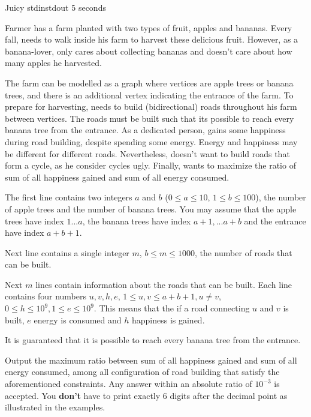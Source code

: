 \begin{problem}{Juicy}
{stdin}{stdout}
{5 seconds}{}{}

Farmer \pittoresque has a farm planted with two types of fruit, apples and bananas. Every fall, \pittoresque needs to walk inside his farm to harvest these delicious fruit. However, as a banana-lover, \pittoresque only cares about collecting bananas and doesn't care about how many apples he harvested. 

The farm can be modelled as a graph where vertices are apple trees or banana trees, and there is an additional vertex indicating the entrance of the farm. To prepare for harvesting, \pittoresque needs to build (bidirectional) roads throughout his farm between vertices. The roads must be built such that its possible to reach every banana tree from the entrance. As a dedicated person, \pittoresque gains some happiness during road building, despite spending some energy. Energy and happiness may be different for different roads. Nevertheless, \pittoresque doesn't want to build roads that form a cycle, as he consider cycles ugly. Finally, \pittoresque wants to maximize the ratio of sum of all happiness gained and sum of all energy consumed.

\InputFile

The first line contains two integers $a$ and $b$ ($0 \le a \le 10$, $1 \le b \le 100$), the number of apple trees and the number of banana trees. You may assume that the apple trees have index $1 ... a$, the banana trees have index $a + 1, ... a + b$ and the entrance have index $a + b + 1$.

Next line contains a single integer $m$, $b \leq m \leq 1000$, the number of roads that can be built.

Next $m$ lines contain information about the roads that can be built. Each line contains four numbers $u, v, h, e$, $1 \le u, v \le a + b + 1, u \neq v$, $0 \le h \le 10^9, 1 \le e \le 10^9$. This means that the if a road connecting $u$ and $v$ is built, $e$ energy is consumed and $h$ happiness is gained.

It is guaranteed that it is possible to reach every banana tree from the entrance.

\OutputFile

Output the maximum ratio between sum of all happiness gained and sum of all energy consumed, among all configuration of road building that satisfy the aforementioned constraints. Any answer within an absolute ratio of $10^{-3}$ is accepted. You \textbf{don't} have to print exactly 6 digits after the decimal point as illustrated in the examples.

\newpage

\Examples

\begin{example}
%
\end{example}

\begin{example}
%
\end{example}



\end{problem}